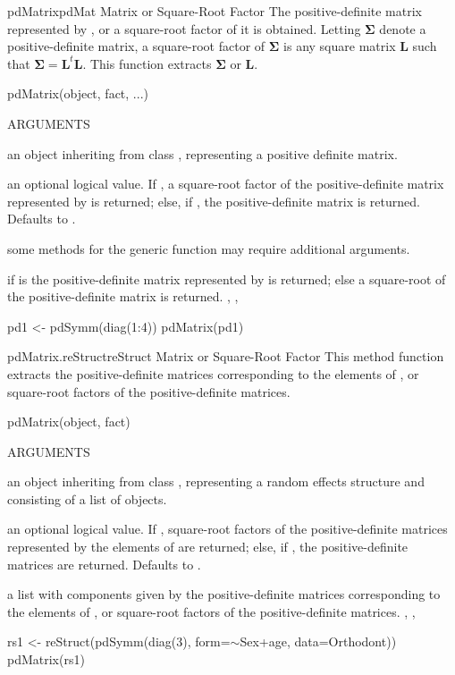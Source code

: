 \documentclass[pdftex]{article} \usepackage{url,graphicx}
\newcommand{\bm}[1]{{\boldsymbol {#1}}}
\newcommand{\bS}{\bm\Sigma}
\newcommand{\bL}{{\bm L}}
\renewcommand{\Twiddle}{\mbox{\(\sim\)}}
\begin{document}
\begin{Helpfile}{pdMatrix}{pdMat Matrix or Square-Root Factor}
The positive-definite matrix represented by , or a
square-root factor of it is obtained. Letting $\bS$ denote a
positive-definite matrix, a square-root factor of $\bS$ is
any square matrix $\bL$ such that $\bS = \bL^{t}\bL$. This function
extracts $\bS$ or $\bL$.
\begin{Example}
pdMatrix(object, fact, ...)
\end{Example}
\begin{Argument}{ARGUMENTS}
\item[\Co{object:}]
an object inheriting from class , representing
a positive definite matrix.
\item[\Co{fact:}]
an optional logical value. If , a square-root
factor of the positive-definite matrix represented by 
is returned; else, if , the positive-definite matrix is
returned. Defaults to .
\item[\Co{...:}]
some methods for the generic function may require
additional arguments.
\end{Argument}
if  is  the positive-definite matrix
represented by  is returned; else a square-root of the
positive-definite matrix is returned.
, ,
\need 15pt
\vspace{-16pt} 
\begin{Example}
pd1 <- pdSymm(diag(1:4))
pdMatrix(pd1)
\end{Example}
\end{Helpfile}
\begin{Helpfile}{pdMatrix.reStruct}{reStruct Matrix or Square-Root Factor}
This method function extracts the positive-definite  matrices
corresponding to the  elements of , or
square-root factors of the positive-definite matrices.
\begin{Example}
pdMatrix(object, fact)
\end{Example}
\begin{Argument}{ARGUMENTS}
\item[\Co{object:}]
an object inheriting from class ,
representing a random effects structure and consisting of a list of
 objects.
\item[\Co{fact:}]
an optional logical value. If , square-root
factors of the positive-definite matrices represented by the elements
of  are returned; else, if , the
positive-definite matrices are returned. Defaults to .
\end{Argument}
a list with components given by the positive-definite matrices
corresponding to the elements of , or square-root factors
of the positive-definite matrices.
, ,
\need 15pt
\vspace{-16pt} 
\begin{Example}
rs1 <- reStruct(pdSymm(diag(3), form=\Twiddle Sex+age, data=Orthodont))
pdMatrix(rs1)
\end{Example}
\end{Helpfile}
\end{document}
